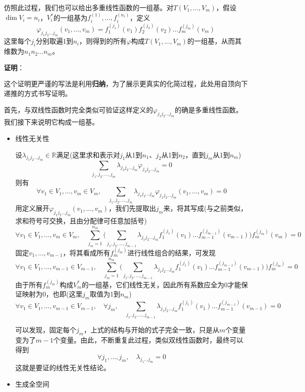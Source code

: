 \documentclass[a4paper,UTF8,fontset=windows,AutoFakeBold]{ctexart}
\newcommand*{\note}{\noindent *}
\newcommand{\proo}[1]{{\vspace{5pt}\kaishu\noindent\textbf{证明}：\vspace{-3pt}
\begin{compactitem}
    \item[] #1
\end{compactitem}
}}
\begin{document}
仿照此过程，我们也可以给出多重线性函数的一组基。对$T(V_1,\dots,V_m)$，假设$\dim V_i=n_i$，$V_i^*$的一组基为$f_i^{(1)},\dots,f_i^{(n_i)}$，定义
$$\varphi_{j_1j_2\dots j_m}(v_1,\dots,v_m)=f_1^{(j_1)}(v_1)f_2^{(j_2)}(v_2)\dots f_m^{(j_m)}(v_m)$$
这里每个$j_i$分别取遍1到$n_i$，则得到的所有$\varphi$构成$T(V_1,\dots,V_m)$的一组基，从而其维数为$n_1n_2\dots n_m$。

\proo{
    \note 这个证明更严谨的写法是利用\textbf{归纳}，为了展示更真实的化简过程，此处用自顶向下递推的方式书写证明。

    首先，与双线性函数时完全类似可验证这样定义的$\varphi_{j_1j_2\dots j_m}$的确是多重线性函数。我们接下来说明它构成一组基。
    \begin{itemize}
        \item 线性无关性
        
        设$\lambda_{j_1j_2\dots j_m}\in\mathbb{R}$满足(这里求和表示对$j_1$从1到$n_1$、$j_2$从1到$n_2$，直到$j_m$从1到$n_m$)
        $$\sum_{j_1,j_2,\dots,j_m}\lambda_{j_1j_2\dots j_m}\varphi_{j_1j_2\dots j_m}=0$$
        则有
        $$\forall v_1\in V_1,\dots,v_m\in V_m,\quad\sum_{j_1,j_2,\dots,j_m}\lambda_{j_1j_2\dots j_m}\varphi_{j_1j_2\dots j_m}(v_1,\dots,v_m)=0$$
        用定义展开$\varphi_{j_1j_2\dots j_m}(v_1,\dots,v_m)$，我们先提取出$j_m$来，将其写成(与之前类似，求和符号可交换，且由分配律可任意加括号)
        $$\forall v_1\in V_1,\dots,v_m\in V_m,\quad\sum_{j_m=1}^{n_m}\bigg(\sum_{j_1,j_2,\dots,j_{m-1}}\lambda_{j_1j_2\dots j_m}f_1^{(j_1)}(v_1)\dots f_{m-1}^{(j_{m-1})}(v_{m-1})\bigg)f_m^{(j_m)}(v_m)=0$$
        固定$v_1,\dots,v_{m-1}$，将其看成所有$f_m^{(j_m)}$进行线性组合的结果，可发现
        $$\forall v_1\in V_1,\dots,v_{m-1}\in V_{m-1},\quad\sum_{j_m=1}^{n_m}\bigg(\sum_{j_1,j_2,\dots,j_{m-1}}\lambda_{j_1j_2\dots j_m}f_1^{(j_1)}(v_1)\dots f_{m-1}^{(j_{m-1})}(v_{m-1})\bigg)f_m^{(j_m)}=0$$
        由于所有$f_m^{(j_m)}$构成$V_m^*$的一组基，它们线性无关，因此所有系数应全为0才能保证映射为0，也即(这里$j_m$取值为1到$n_m$)
        $$\forall v_1\in V_1,\dots,v_{m-1}\in V_{m-1},\quad\forall j_m,\quad\sum_{j_1,j_2,\dots,j_{m-1}}\lambda_{j_1j_2\dots j_m}f_1^{(j_1)}(v_1)\dots f_{m-1}^{(j_{m-1})}(v_{m-1})=0$$

        可以发现，固定每个$j_m$，上式的结构与开始的式子完全一致，只是从$m$个变量变为了$m-1$个变量。由此，不断重复此过程，类似双线性函数时，最终可以得到
        $$\forall j_1,\dots,j_m,\quad \lambda_{j_1\dots j_m}=0$$
        这就是要证的线性无关性结论。

        \item 生成全空间
        

\end{itemize}}
\end{document}
